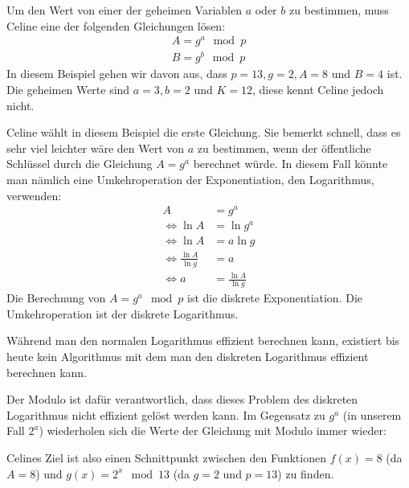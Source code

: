 \documentclass[twocolumn]{report}
\begin{document}
Um den Wert von einer der geheimen Variablen $a$ oder $b$ zu bestimmen,
muss Celine eine der folgenden Gleichungen lösen:
\begin{align}
    A=g^a \mod p \\
    B=g^b \mod p
\end{align}
In diesem Beispiel gehen wir davon aus, dass $p=13,g=2,A=8$ und $B=4$ ist.
Die geheimen Werte sind $a=3,b=2$ und $K=12$, diese kennt Celine jedoch nicht.

Celine wählt in diesem Beispiel die erste Gleichung.
Sie bemerkt schnell, dass es sehr viel leichter wäre den
Wert von $a$ zu bestimmen, wenn der öffentliche Schlüssel durch
die Gleichung $A=g^a$ berechnet würde.
In diesem Fall könnte man nämlich eine Umkehroperation der Exponentiation,
den Logarithmus, verwenden:
\begin{align}
    A&=g^a \\
    \Leftrightarrow \ln{A}&=\ln{g^a} \\
    \Leftrightarrow \ln{A}&=a\ln{g} \\
    \Leftrightarrow \frac{\ln{A}}{\ln{g}}&=a \\
    \Leftrightarrow a&=\frac{\ln{A}}{\ln{g}}
\end{align}
Die Berechnung von $A=g^a\mod p$ ist die diskrete Exponentiation.
Die Umkehroperation ist der diskrete Logarithmus.

Während man den normalen Logarithmus effizient berechnen kann, existiert
bis heute kein Algorithmus mit dem man den diskreten Logarithmus effizient
berechnen kann.

Der Modulo ist dafür verantwortlich, dass dieses Problem des diskreten
Logarithmus nicht effizient gelöst werden kann.
Im Gegensatz zu $g^a$ (in unserem Fall $2^a$) wiederholen sich die Werte
der Gleichung mit Modulo immer wieder:

\begin{center}
\end{center}
Celines Ziel ist also einen Schnittpunkt zwischen
den Funktionen $f(x)=8$ (da $A=8$)
und $g(x)=2^x\mod 13$ (da $g=2$ und $p=13$) zu finden.
\end{document}
